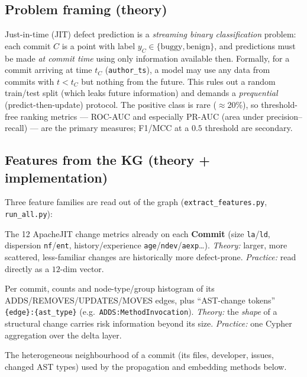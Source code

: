 \documentclass[11pt,a4paper]{article}
\newcommand{\code}[1]{\texttt{#1}}
\newcommand{\node}[1]{\textcolor{kgblue}{\textbf{#1}}}
\newcommand{\edge}[1]{\textsc{#1}}
\begin{document}
\subsection{Problem framing (theory)}
Just-in-time (JIT) defect prediction is a \emph{streaming binary
classification} problem: each commit $C$ is a point with label
$y_C\in\{\text{buggy},\text{benign}\}$, and predictions must be made
\emph{at commit time} using only information available then. Formally, for a
commit arriving at time $t_C$ (\code{author\_ts}), a model may use any data from
commits with $t<t_C$ but nothing from the future. This rules out a random
train/test split (which leaks future information) and demands a
\emph{prequential} (predict-then-update) protocol. The positive class is rare
($\approx$20\%), so threshold-free ranking metrics --- ROC-AUC and especially
PR-AUC (area under precision--recall) --- are the primary measures; F1/MCC at a
$0.5$ threshold are secondary.

\subsection{Features from the KG (theory + implementation)}
Three feature families are read out of the graph
(\texttt{extract\_features.py}, \texttt{run\_all.py}):
\begin{description}[nosep,leftmargin=1.4em]
  \item[Process metrics.] The 12 ApacheJIT change metrics already on each
        \node{Commit} (size \code{la}/\code{ld}, dispersion \code{nf}/\code{ent},
        history/experience \code{age}/\code{ndev}/\code{aexp}\ldots). \emph{Theory:}
        larger, more scattered, less-familiar changes are historically more
        defect-prone. \emph{Practice:} read directly as a $12$-dim vector.
  \item[Delta-graph features.] Per commit, counts and node-type/group histogram
        of its \edge{ADDS}/\edge{REMOVES}/\edge{UPDATES}/\edge{MOVES} edges, plus
        ``AST-change tokens'' \code{\{edge\}:\{ast\_type\}}
        (e.g.\ \code{ADDS:MethodInvocation}). \emph{Theory:} the \emph{shape} of a
        structural change carries risk information beyond its size. \emph{Practice:}
        one Cypher aggregation over the delta layer.
  \item[Topology.] The heterogeneous neighbourhood of a commit (its files,
        developer, issues, changed AST types) used by the propagation and
        embedding methods below.
\end{description}
\end{document}
